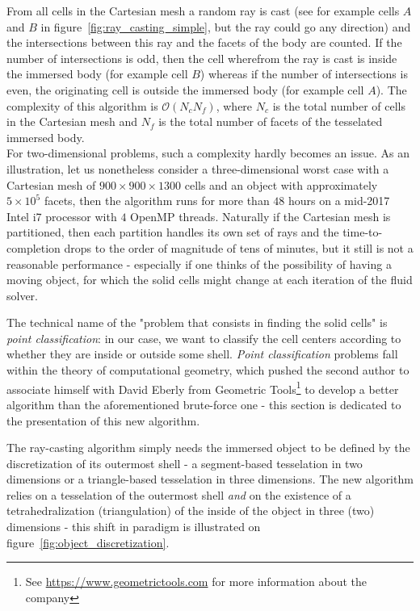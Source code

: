 From all cells in the Cartesian mesh a random ray is cast (see for example cells $A$ and $B$ in figure~\ref{fig:ray_casting_simple}, but the ray could go any direction) and the intersections between this ray and the facets of the body are counted.
If the number of intersections is odd, then the cell wherefrom the ray is cast is inside the immersed body (for example cell $B$) whereas if the number of intersections is even, the originating cell is outside the immersed body (for example cell $A$).
The complexity of this algorithm is $\mathcal{O}\left( N_c N_f\right)$, where $N_c$ is the total number of cells in the Cartesian mesh and $N_f$ is the total number of facets of the tesselated immersed body. \\
For two-dimensional problems, such a complexity hardly becomes an issue.
As an illustration, let us nonetheless consider a three-dimensional worst case with a Cartesian mesh of $900 \times 900 \times 1300$ cells and an object with approximately $5\times 10^5$ facets, then the algorithm runs for more than $48$ hours on a mid-2017 Intel i7 processor with $4$ OpenMP threads.
Naturally if the Cartesian mesh is partitioned, then each partition handles its own set of rays and the time-to-completion drops to the order of magnitude of tens of minutes, but it still is not a reasonable performance - especially if one thinks of the possibility of having a moving object, for which the solid cells might change at each iteration of the fluid solver.

The technical name of the "problem that consists in finding the solid cells" is \emph{point classification}: in our case, we want to classify the cell centers according to whether they are inside or outside some shell.
\emph{Point classification} problems fall within the theory of computational geometry, which pushed the second author to associate himself with David Eberly \cite{schneider2002geometric} from Geometric Tools\footnote{See \url{https://www.geometrictools.com} for more information about the company} to develop a better algorithm than the aforementioned brute-force one - this section is dedicated to the presentation of this new algorithm.

The ray-casting algorithm simply needs the immersed object to be defined by the discretization of its outermost shell - a segment-based tesselation in two dimensions or a triangle-based tesselation in three dimensions.
The new algorithm relies on a tesselation of the outermost shell \emph{and} on the existence of a tetrahedralization (triangulation) of the inside of the object in three (two) dimensions - this shift in paradigm is illustrated on figure~\ref{fig:object_discretization}.

